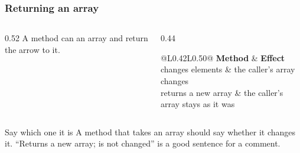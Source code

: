 \documentclass[aspectratio=169,10pt,compress]{beamer}
\begin{document}
\begin{frame}[t,fragile] \frametitle{Returning an array}
	\begin{columns}[T]
		\begin{column}{0.52\textwidth}
			A method can  an array and return the arrow to it.

			\vspace{0.5em}
		\end{column}
		\begin{column}{0.44\textwidth}


\begin{table}
				\small
				\begin{tabular}{@{}L{0.42\textwidth}L{0.50\textwidth}@{}}
					\toprule
					\textbf{Method} & \textbf{Effect} \\
					\midrule
					changes elements   & the caller's array changes \\
					returns a new array & the caller's array stays as it was \\
					\bottomrule
				\end{tabular}
\end{table}%
		\end{column}
	\end{columns}

	\vspace{0.5em}
	\begin{block}{Say which one it is}
		A method that takes an array should say whether it changes it.
		``Returns a new array;  is not changed'' is a good sentence for a comment.
	\end{block}
\end{frame}




\end{document}
